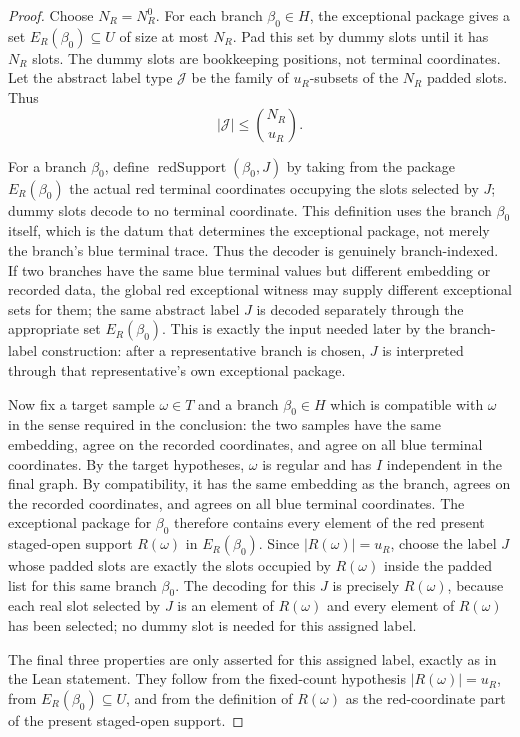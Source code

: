 \begin{proof}
Choose \(N_R=N_R^0\).  For each branch \(\beta_0\in H\), the exceptional
package gives a set \(E_R(\beta_0)\subseteq U\) of size at most \(N_R\).
Pad this set by dummy slots until it has \(N_R\) slots.  The dummy slots are
bookkeeping positions, not terminal coordinates.  Let the abstract label type
\(\mathcal J\) be the family of \(u_R\)-subsets of the \(N_R\) padded slots.
Thus
\[
|\mathcal J|\le\binom{N_R}{u_R}.
\]

For a branch \(\beta_0\), define \(\operatorname{redSupport}(\beta_0,J)\)
by taking from the package \(E_R(\beta_0)\) the actual red terminal
coordinates occupying the slots selected by \(J\); dummy slots decode to no
terminal coordinate.  This definition uses the branch \(\beta_0\) itself,
which is the datum that determines the exceptional package, not merely the
branch's blue terminal trace.
Thus the decoder is genuinely branch-indexed.  If two branches have the same
blue terminal values but different embedding or recorded data, the global
red exceptional witness may supply different exceptional sets for them; the
same abstract label \(J\) is decoded separately through the appropriate
set \(E_R(\beta_0)\).  This is exactly the input needed later by the
branch-label construction: after a representative branch is chosen, \(J\) is
interpreted through that representative's own exceptional package.

Now fix a target sample \(\omega\in T\) and a branch \(\beta_0\in H\) which
is compatible with \(\omega\) in the sense required in the conclusion: the
two samples have the same embedding, agree on the recorded coordinates, and
agree on all blue terminal coordinates.  By the target hypotheses,
\(\omega\) is regular and has
\(I\) independent in the final graph.  By compatibility, it has the same
embedding as the branch, agrees on the recorded coordinates, and agrees on
all blue terminal coordinates.  The exceptional package for \(\beta_0\)
therefore contains every element of the red present staged-open support
\(R(\omega)\) in \(E_R(\beta_0)\).  Since \(|R(\omega)|=u_R\), choose the
label \(J\) whose padded slots are exactly the slots occupied by
\(R(\omega)\) inside the padded list for this same branch \(\beta_0\).  The
decoding for this \(J\) is precisely \(R(\omega)\), because each real slot
selected by \(J\) is an element of \(R(\omega)\) and every element of
\(R(\omega)\) has been selected; no dummy slot is needed for this assigned
label.

The final three properties are only asserted for this assigned label, exactly
as in the Lean statement.  They follow from the fixed-count hypothesis
\(|R(\omega)|=u_R\), from \(E_R(\beta_0)\subseteq U\), and from the definition
of \(R(\omega)\) as the red-coordinate part of the present staged-open
support.
\end{proof}
